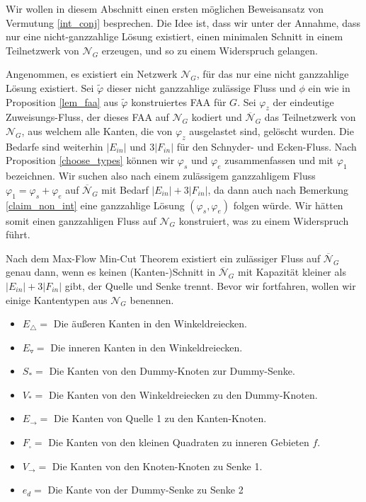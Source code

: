 Wir wollen in diesem Abschnitt einen ersten möglichen Beweisansatz von Vermutung \ref{int_conj} besprechen. Die Idee ist, dass wir unter der Annahme, dass nur eine nicht-ganzzahlige Lösung existiert, einen minimalen Schnitt in einem Teilnetzwerk von $\mathcal{N}_G$ erzeugen, und so zu einem Widerspruch gelangen. 

Angenommen, es existiert ein Netzwerk $\mathcal{N}_G$, für das nur eine nicht ganzzahlige Lösung existiert. Sei $\tilde{\varphi}$ dieser nicht ganzzahlige zulässige Fluss und $\phi$ ein wie in Proposition \ref{lem_faa} aus $\tilde{\varphi}$ konstruiertes FAA für $G$. Sei $\varphi_z$ der eindeutige Zuweisungs-Fluss, der dieses FAA auf $\mathcal{N}_G$ kodiert und $\overline{\mathcal{N}}_G$ das Teilnetzwerk von $\mathcal{N}_G$, aus welchem alle Kanten, die von $\varphi_z$ ausgelastet sind, gelöscht wurden. Die Bedarfe sind weiterhin $|E_{in}|$ und $3|F_{in}|$ für den Schnyder- und Ecken-Fluss. Nach Proposition \ref{choose_types} können wir $\varphi_s$ und $\varphi_e$ zusammenfassen und mit $\varphi_1$ bezeichnen. Wir suchen also nach einem zulässigem ganzzahligem Fluss $\varphi_1 = \varphi_s + \varphi_e$ auf $\overline{\mathcal{N}}_G$ mit Bedarf $|E_{in}| + 3|F_{in}|$, da dann auch nach Bemerkung \ref{claim_non_int} eine ganzzahlige Lösung $(\varphi_s,\varphi_e)$ folgen würde. Wir hätten somit einen ganzzahligen Fluss auf $\mathcal{N}_G$ konstruiert, was zu einem Widerspruch führt.

Nach dem Max-Flow Min-Cut Theorem existiert ein zulässiger Fluss auf $\overline{\mathcal{N}}_G$ genau dann, wenn es keinen (Kanten-)Schnitt in $\overline{\mathcal{N}}_G$ mit Kapazität kleiner als $|E_{in}| + 3|F_{in}|$ gibt, der Quelle und Senke trennt. Bevor wir fortfahren, wollen wir einige Kantentypen aus $\mathcal{N}_G$ benennen.

\begin{itemize}
\item $E_\triangle = $ Die äußeren Kanten in den Winkeldreiecken.
\item $E_\triangledown = $ Die inneren Kanten in den Winkeldreiecken.
\item $S_* =$ Die Kanten von den Dummy-Knoten zur Dummy-Senke.
\item $V_* = $ Die Kanten von den Winkeldreiecken zu den Dummy-Knoten.
\item $E_{\to} = $ Die Kanten von Quelle 1 zu den Kanten-Knoten.
\item $F_\square = $ Die Kanten von den kleinen Quadraten zu inneren Gebieten $f$.
\item $V_{\to} = $ Die Kanten von den Knoten-Knoten zu Senke 1.
\item $e_{d} = $ Die Kante von der Dummy-Senke zu Senke 2
\end{itemize}

